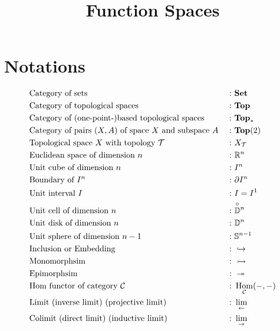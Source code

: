 \documentclass[a4paper]{article}
\theoremstyle{plain}
\theoremstyle{definition}
\theoremstyle{remark}
\newcommand{\mc}[1]{\mathcal{#1}}
\newcommand{\mbf}[1]{\mathbf{#1}}
\newcommand{\bbD}{\mathbb D}
\newcommand{\bbS}{\mathbb S}
\newcommand{\mcC}{\mc C}
\newcommand{\mcT}{\mc T}
\newcommand{\bbRn}{\mathbb R^n}
\newcommand{\unitcell}[1]{\overset{\!\!\!\! \circ}{\bbD^{#1}}}
\DeclareMathOperator{\Hom}{\rm{Hom}}
\begin{document}
    \title{Function Spaces}
    \author{{\color{pink}{Cloudi}}{\color{Aquamarine}{fold}}}
    \maketitle
    \newpage

    \setcounter{section}{-1}

    \section{Notations}

    \begin{align*}
        & \text{Category of sets } &: \ & \mbf{Set} \\
        & \text{Category of topological spaces }&: \ & \mbf{Top} \\
        & \text{Category of (one-point-)based topological spaces }&: \  & \mbf{Top}_* \\
        & \text{Category of pairs $(X,A)$ of space $X$ and subspace $A$ } &: \ & \mbf{Top}(2) \\
        & \text{Topological space $X$ with topology $\mcT$ } &: \ & X_{\mcT}\\
        & \text{Euclidean space of dimension $n$ } &: \ & \bbRn\\
        & \text{Unit cube of dimension $n$ } &: \ & I^n\\
        & \text{Boundary of $I^n$ }          &: \ & \partial I^n\\
        & \text{Unit interval $I$}           &: \ & I = I^1\\
        & \text{Unit cell of dimension $n$ } &: \ & \unitcell{n} \\
        & \text{Unit disk of dimension $n$ } &: \ & \bbD^n\\
        & \text{Unit sphere of dimension $n-1$ } &: \ & \bbS^{n-1}\\
        & \text{Inclusion or Embedding } &: \ & \hookrightarrow \\
        & \text{Monomorphsim }      &: \ & \rightarrowtail \\
        & \text{Epimorphsim }       &: \ & \twoheadrightarrow \\
        & \text{Hom functor of category $\mcC $} &: \ & \Hom_{\mcC}(-,-)\\
        & \text{Limit (inverse limit) (projective limit) } &: \ & \lim_{\leftarrow} \\
        & \text{Colimit (direct limit) (inductive limit) } &: \ & \lim_{\rightarrow} \\
    \end{align*}
\end{document}
